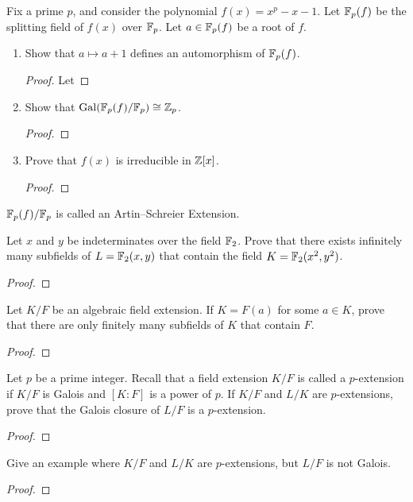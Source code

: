 \begin{problem}
Fix a prime $p$, and consider the polynomial $f(x)=x^p-x-1$. Let
$\mathbb{F}_p(f)$ be the splitting field of $f(x)$ over $\mathbb{F}_p$. Let
$a\in\mathbb{F}_p(f)$ be a root of $f$.
\begin{enumerate}[label=(\alph*)]
\item Show that $a\mapsto a+1$ defines an automorphism of $\mathbb{F}_p(f)$.
\begin{proof}
Let
\end{proof}
\item Show that $\operatorname{Gal}(\mathbb{F}_p(f)/\mathbb{F}_p)\cong\mathbb{Z}_p$.
\begin{proof}
\end{proof}
\item Prove that $f(x)$ is irreducible in $\mathbb{Z}[x]$.
\begin{proof}
\end{proof}
\end{enumerate}
$\mathbb{F}_p(f)/\mathbb{F}_p$ is called an Artin--Schreier Extension.
\end{problem}

\begin{problem}
Let $x$ and $y$ be indeterminates over the field $\mathbb{F}_2$. Prove that there
exists infinitely many subfields of $L=\mathbb{F}_2(x,y)$ that contain the field
$K=\mathbb{F}_2(x^2,y^2)$.
\begin{proof}
\end{proof}
\end{problem}

\begin{problem}
Let $K/F$ be an algebraic field extension. If $K=F(a)$ for some $a\in K$,
prove that there are only finitely many subfields of $K$ that contain $F$.
\begin{proof}
\end{proof}
\end{problem}

\begin{problem}
Let $p$ be a prime integer. Recall that a field extension $K/F$ is called a
$p$-extension if $K/F$ is Galois and $[K:F]$ is a power of $p$. If $K/F$
and $L/K$ are $p$-extensions, prove that the Galois closure of $L/F$ is a
$p$-extension.
\begin{proof}
\end{proof}
\end{problem}

\begin{problem}
Give an example where $K/F$ and $L/K$ are $p$-extensions, but $L/F$ is not
Galois.
\begin{proof}
\end{proof}
\end{problem}

